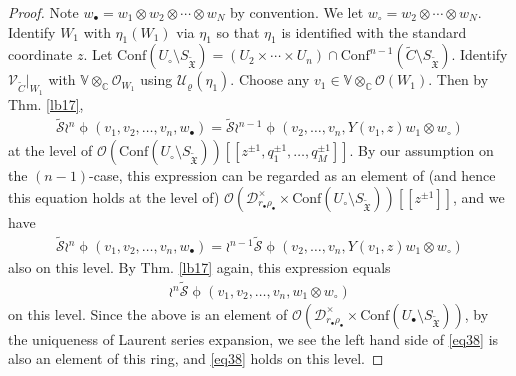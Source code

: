 \documentclass[12pt,a4paper,notitlepage]{article}
\theoremstyle{definition}
\theoremstyle{plain}
\newcommand{\fk}{\mathfrak}
\newcommand{\mc}{\mathcal}
\newcommand{\wtd}{\widetilde}
\newcommand{\Conf}{\mathrm{Conf}}
\newcommand{\scr}{\mathscr}
\newcommand{\blt}{\bullet}
\newcommand{\Vbb}{\mathbb V}
\newcommand{\Cbb}{\mathbb C}
\newcommand{\SXtd}{S_{\wtd{\fk X}}}
\numberwithin{equation}{section}
\begin{document}
\begin{proof}
Note $w_\blt=w_1\otimes w_2\otimes\cdots\otimes w_N$ by convention. We let $w_\circ=w_2\otimes\cdots \otimes w_N$. Identify $W_1$ with $\eta_1(W_1)$ via $\eta_1$ so that $\eta_1$ is identified with the standard coordinate $z$. Let $\Conf(U_\circ\setminus\SXtd)=(U_2\times\cdots\times U_n)\cap\Conf^{n-1}(\wtd C\setminus\SXtd)$. Identify $\scr V_{\wtd C}|_{W_1}$ with $\Vbb\otimes_\Cbb\scr O_{W_1}$ using $\mc U_\varrho(\eta_1)$. Choose any $v_1\in\Vbb\otimes_\Cbb\scr O(W_1)$. Then by Thm. \ref{lb17},
\begin{align*}
\wtd{\mc S}\wr^n\upphi(v_1,v_2,\dots,v_n,w_\blt)=\wtd{\mc S}\wr^{n-1}\upphi(v_2,\dots,v_n,Y(v_1,z)w_1\otimes w_\circ)	
\end{align*}
at the level of $\scr O(\Conf(U_\circ\setminus\SXtd))[[z^{\pm 1},q_1^{\pm1},\dots,q_M^{\pm1}]]$. By our assumption on the $(n-1)$-case, this expression can be regarded as an element of (and hence this equation holds at the level of) $\scr O(\mc D_{r_\blt\rho_\blt}^\times\times\Conf(U_\circ\setminus\SXtd))[[z^{\pm 1}]]$, and we have
\begin{align*}
\wtd{\mc S}\wr^n\upphi(v_1,v_2,\dots,v_n,w_\blt)=\wr^{n-1}\wtd{\mc S}\upphi(v_2,\dots,v_n,Y(v_1,z)w_1\otimes w_\circ)	
\end{align*}
also on this level. By Thm. \ref{lb17} again, this expression equals
\begin{align*}
\wr^n\wtd{\mc S}\upphi(v_1,v_2,\dots,v_n,w_1\otimes w_\circ)	
\end{align*}
on this level. Since the above is an element of $\scr O(\mc D_{r_\blt\rho_\blt}^\times\times\Conf(U_\blt\setminus\SXtd))$, by the uniqueness of Laurent series expansion, we see the left hand side of \eqref{eq38} is also an element of this ring, and \eqref{eq38} holds on this level.
\end{proof}
\end{document}
